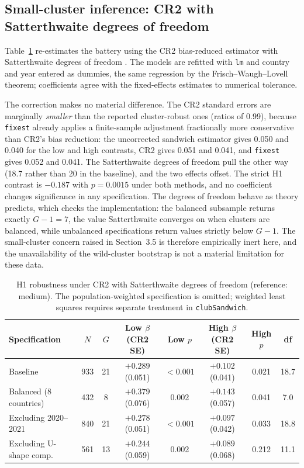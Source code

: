 \documentclass[12pt,a4paper]{report}
\begin{document}
\subsection{Small-cluster inference: CR2 with Satterthwaite degrees of freedom}
\label{sec:cr2}
Table~\ref{tab:cr2} re-estimates the battery using the CR2 bias-reduced estimator with Satterthwaite
degrees of freedom \citep{pustejovskytipton2018}. The models are refitted with \texttt{lm} and country
and year entered as dummies, the same regression by the Frisch--Waugh--Lovell theorem; coefficients
agree with the fixed-effects estimates to numerical tolerance.

The correction makes no material difference. The CR2 standard errors are marginally \emph{smaller}
than the reported cluster-robust ones (ratios of 0.99), because \texttt{fixest} already applies a
finite-sample adjustment fractionally more conservative than CR2's bias reduction: the
uncorrected sandwich estimator gives 0.050 and 0.040 for the low and high contrasts, CR2 gives
0.051 and 0.041, and \texttt{fixest} gives 0.052 and 0.041. The Satterthwaite degrees of freedom
pull the other way (18.7 rather than 20 in the baseline), and the two effects offset.
The strict H1 contrast is $-0.187$ with $p=0.0015$ under both methods, and no coefficient changes
significance in any specification. The degrees of freedom behave as theory predicts, which checks the
implementation: the balanced subsample returns exactly $G-1=7$, the value Satterthwaite converges on
when clusters are balanced, while unbalanced specifications return values strictly below $G-1$. The
small-cluster concern raised in Section~3.5 is therefore empirically inert here, and the unavailability
of the wild-cluster bootstrap is not a material limitation for these data.

\begin{table}[ht]
\centering
\caption{H1 robustness under CR2 with Satterthwaite degrees of freedom (reference: medium). The population-weighted specification is omitted; weighted least squares requires separate treatment in \texttt{clubSandwich}.}
\label{tab:cr2}
\small
\begin{tabular}{@{}lccccccc@{}}
\toprule
Specification & $N$ & $G$ & Low $\beta$ (CR2 SE) & Low $p$ & High $\beta$ (CR2 SE) & High $p$ & df \\
\midrule
Baseline                 & 933 & 21 & $+0.289$ (0.051) & $<0.001$ & $+0.102$ (0.041) & 0.021 & 18.7 \\
Balanced (8 countries)   & 432 & 8  & $+0.379$ (0.076) & 0.002    & $+0.143$ (0.057) & 0.041 & 7.0 \\
Excluding 2020--2021     & 840 & 21 & $+0.278$ (0.051) & $<0.001$ & $+0.097$ (0.042) & 0.033 & 18.8 \\
Excluding U-shape comp.  & 561 & 13 & $+0.244$ (0.059) & 0.002    & $+0.089$ (0.068) & 0.212 & 11.1 \\
\bottomrule
\end{tabular}
\end{table}
\end{document}

